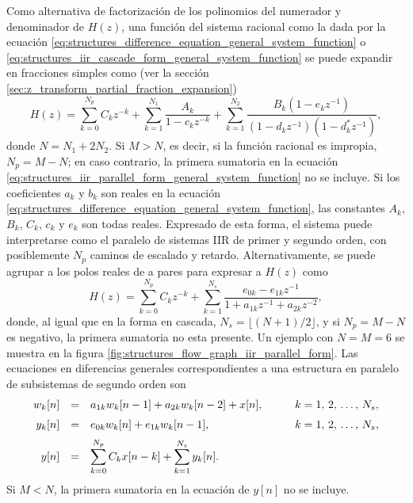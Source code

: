 \documentclass[a4paper]{report}
\begin{document}
Como alternativa de factorización de los polinomios del numerador y denominador de \(H(z)\), una función del sistema racional como la dada por la ecuación \ref{eq:structures_difference_equation_general_system_function} o \ref{eq:structures_iir_cascade_form_general_system_function} se puede expandir en fracciones simples como (ver la sección \ref{sec:z_transform_partial_fraction_expansion})
\begin{equation}\label{eq:structures_iir_parallel_form_general_system_function}
 H(z)=\sum_{k=0}^{N_p}C_kz^{-k}+\sum_{k=1}^{N_1}\frac{A_k}{1-c_kz^{-k}}+\sum_{k=1}^{N_2}\frac{B_k(1-e_kz^{-1})}{(1-d_kz^{-1})(1-d^*_kz^{-1})}, 
\end{equation}
donde \(N=N_1+2N_2\). Si \(M>N\), es decir, si la función racional es impropia, \(N_p=M-N\); en caso contrario, la primera sumatoria en la ecuación \ref{eq:structures_iir_parallel_form_general_system_function} no se incluye. Si los coeficientes \(a_k\) y \(b_k\) son reales en la ecuación \ref{eq:structures_difference_equation_general_system_function}, las constantes \(A_k\), \(B_k\), \(C_k\), \(c_k\) y \(e_k\) son todas reales. Expresado de esta forma, el sistema puede interpretarse como el paralelo de sistemas IIR de primer y segundo orden, con posiblemente \(N_p\) caminos de escalado y retardo. Alternativamente, se puede agrupar a los polos reales de a pares para expresar a \(H(z)\) como
\[
 H(z)=\sum_{k=0}^{N_p}C_kz^{-k}+\sum_{k=1}^{N_s}\frac{e_{0k}-e_{1k}z^{-1}}{1+a_{1k}z^{-1}+a_{2k}z^{-2}}, 
\]
donde, al igual que en la forma en cascada, \(N_s=\lfloor(N+1)/2\rfloor\), y si \(N_p=M-N\) es negativo, la primera sumatoria no esta presente. Un ejemplo con \(N=M=6\) se muestra en la figura \ref{fig:structures_flow_graph_iir_parallel_form}. Las ecuaciones en diferencias generales correspondientes a una estructura en paralelo de subsistemas de segundo orden son
\[
\begin{array}{rcll}
 w_k[n]&=&a_{1k}w_k[n-1]+a_{2k}w_k[n-2]+x[n],&\qquad k=1,\,2,\,\dots,\,N_s,\\[\medskipamount]
 y_k[n]&=&e_{0k}w_k[n]+e_{1k}w_k[n-1],&\qquad k=1,\,2,\,\dots,\,N_s,\\[\medskipamount]
 y[n]&=&\displaystyle\sum_{k=0}^{N_p}C_kx[n-k]+\sum_{k=1}^{N_s}y_k[n].&
\end{array}
\]
Si \(M<N\), la primera sumatoria en la ecuación de \(y[n]\) no se incluye.
\end{document}
